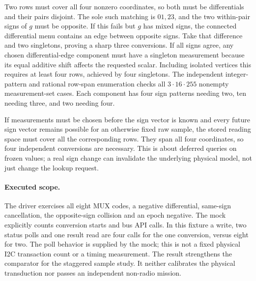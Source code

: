 \documentclass{article}
\begin{document}
Two rows must cover all four nonzero coordinates, so both must
be differentials and their pairs disjoint. The sole such matching
is $01,23$, and the two within-pair signs of $g$ must be opposite.
If this fails but $g$ has mixed signs, the connected differential
menu contains an edge between opposite signs. Take that difference
and two singletons, proving a sharp three conversions. If all
signs agree, any chosen differential-edge component must have a
singleton measurement because its equal additive shift affects
the requested scalar. Including isolated vertices this requires
at least four rows, achieved by four singletons. The independent
integer-pattern and rational row-span enumeration checks all
$3\cdot16\cdot255$ nonempty measurement-set cases. Each component
has four sign patterns needing two, ten needing three, and two
needing four.

If measurements must be chosen before the sign vector is known
and every future sign vector remains possible for an otherwise
fixed raw sample, the stored reading space must cover all the
corresponding rows. They span all four coordinates, so four
independent conversions are necessary. This is about deferred
queries on frozen values; a real sign change can invalidate the
underlying physical model, not just change the lookup request.

\paragraph{Executed scope.}
The driver exercises all eight MUX codes, a negative differential,
same-sign cancellation, the opposite-sign collision and an epoch
negative. The mock explicitly counts conversion starts and bus API
calls. In this fixture a write, two status polls and one result
read are four calls for the one conversion, versus eight for two.
The poll behavior is supplied by the mock; this is not a fixed
physical I2C transaction count or a timing measurement. The result
strengthens the comparator for the staggered sample study. It
neither calibrates the physical transduction nor passes an
independent non-radio mission.
\end{document}

